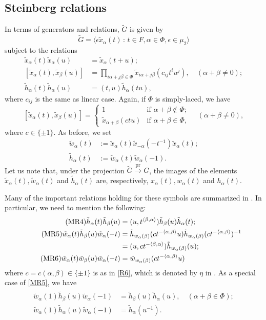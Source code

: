 \documentclass[10pt, letterpaper]{amsart}
\theoremstyle{plain}
\theoremstyle{definition}
\numberwithin{equation}{section}
\newcommand{\pr}{\operatorname{pr}}
\newcommand{\xt}{\tilde{x}}
\newcommand{\wt}{\tilde{w}}
\newcommand{\htt}{\tilde{h}}
\newcommand{\xa}{x_{\alpha}}
\newcommand{\wa}{w_{\alpha}}
\newcommand{\ha}{h_{\alpha}}
\newcommand{\xta}{\tilde{x}_{\alpha}}
\newcommand{\wta}{\tilde{w}_{\alpha}}
\newcommand{\hta}{\tilde{h}_{\alpha}}
\newcommand{\xtb}{\tilde{x}_{\beta}}
\newcommand{\wtb}{\tilde{w}_{\beta}}
\newcommand{\htb}{\tilde{h}_{\beta}}
\newcommand{\Gt}{\widetilde{G}}
\newcommand{\la}{\langle}
\newcommand{\ra}{\rangle}
\newcommand{\st}{\,:\,}
\begin{document}
\subsection{Steinberg relations}


In terms of generators and relations, $\Gt$ is given by
\[
\Gt=\la \epsilon\xta(t)\st t\in F, \alpha\in\Phi, \epsilon\in\mu_2\ra
\]
subject to the relations
\begin{align}
\tag{MR1}\xta(t)\xta(u)&=\xta(t+u);\label{MR1}\\
\tag{MR2}[\xta(t), \xtb(u)]&=\prod_{i\alpha+j\beta\in\Phi}\tilde{x}_{i\alpha+j\beta}(c_{ij}t^iu^j),\quad(\alpha+\beta\neq 0);\label{MR2}\\
\tag{MR3}\hta(t)\hta(u)&=(t, u)\hta(tu),\label{MR3}
\end{align}
where $c_{ij}$ is the same as linear case. Again, if $\Phi$ is simply-laced, we have
\begin{equation}\label{E:MR2'}
\tag{MR2$'$}[\xta(t), \xtb(u)]=\begin{cases}1&\text{if $\alpha+\beta\notin\Phi$};\\
\xt_{\alpha+\beta}(ctu)&\text{if $\alpha+\beta\in\Phi$},
\end{cases}
\quad (\alpha+\beta\neq 0),
\end{equation}
where $c\in\{\pm 1\}$. As before, we set
\begin{align*}
\wta(t)&:=\xta(t)\xt_{-\alpha}(-t^{-1})\xta(t);\\
\hta(t)&:=\wt_{\alpha}(t)\wta(-1).
\end{align*}
Let us note that, under the projection $\Gt\xrightarrow{\,\pr\,} G$, the images of the elements $\xta(t), \wta(t)$ and $\hta(t)$ are, respectively, $\xa(t), \wa(t)$ and $\ha(t)$.



Many of the important relations holding for these symbols are summarized in \cite[p.24]{Matsumoto}. In particular, we need to mention the following:
\begin{align}
\tag{MR4}\label{MR4}\hta(t)\htb(u)&=(u, t^{\la\beta,\alpha\ra})\htb(u)\hta(t);\\
\tag{MR5}\label{MR5}\wta(t)\htb(u)\wta(-t)&=\htt_{w_\alpha(\beta)}(c t^{-\la\alpha, \beta\ra}u)\htt_{w_\alpha(\beta)}(c t^{-\la\alpha, \beta\ra})^{-1}\\
\notag&=(u, c t^{-\la\beta,\alpha\ra})\htt_{w_\alpha(\beta)}(u);\\
\tag{MR6}\label{MR6}\wta(t)\wtb(u)\wta(-t)&=\wt_{w_\alpha(\beta)}(ct^{-\la\alpha, \beta\ra}u)
\end{align}
where $c=c(\alpha, \beta)\in\{\pm 1\}$ is as in \eqref{R6}, which is denoted by $\eta$ in \cite[(c), p.24]{Matsumoto}. As a special case of \eqref{MR5}, we have
\begin{gather}\tag{MR5'}\label{MR5'}
\begin{aligned}
\wta(1)\htb(u)\wta(-1)&=\htb(u)\hta(u),\quad (\alpha+\beta\in\Phi);\\
\wta(1)\hta(u)\wta(-1)&=\hta(u^{-1}).
\end{aligned}
\end{gather}
\end{document}
